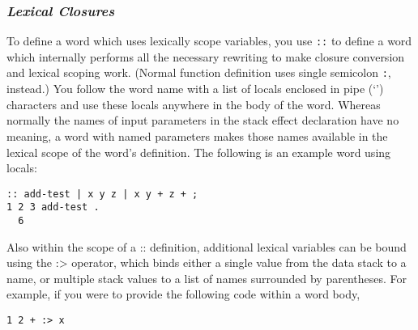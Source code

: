 \documentclass{sig-alternate}
\begin{document}
\subsubsection*{\textit{Lexical Closures}}

To define a word which uses lexically scope variables, you use \texttt{::} to define a word which internally performs all the necessary rewriting to make closure conversion and lexical scoping work. (Normal function definition uses single semicolon \texttt{:}, instead.)  You follow the word name with a list of locals enclosed in pipe (`\textbar') characters and use these locals anywhere in the body of the word. Whereas normally the names of input parameters in the stack effect declaration have no meaning, a word with named parameters makes those names available in the lexical scope of the word's definition.  The following is an example word using locals:

\begin{verbatim}
:: add-test | x y z | x y + z + ;
1 2 3 add-test .
  6
\end{verbatim}

Also within the scope of a :: definition, additional lexical variables can be bound using the :> operator, which binds either a single value from the data stack to a name, or multiple stack values to a list of names surrounded by parentheses. For example, if you were to provide the following code within a word body,

\begin{verbatim}
1 2 + :> x
\end{verbatim}
\end{document}
